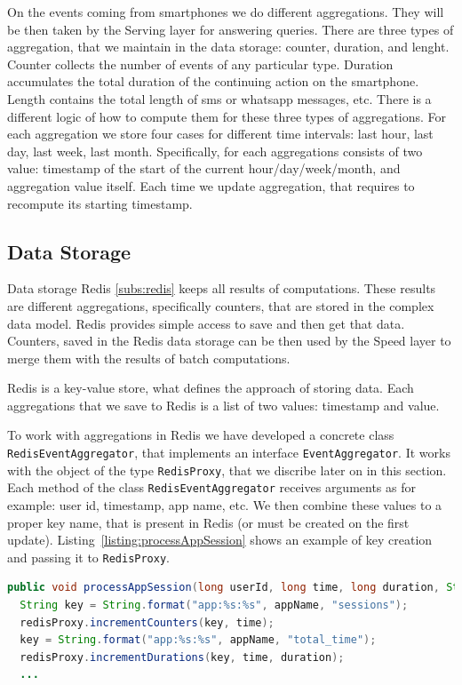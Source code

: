 On the events coming from smartphones we do different aggregations.
They will be then taken by the Serving layer for answering queries.
There are three types of aggregation, that we maintain in the data storage: counter, duration, and lenght.
Counter collects the number of events of any particular type.
Duration accumulates the total duration of the continuing action on the smartphone.
Length contains the total length of sms or whatsapp messages, etc.
There is a different logic of how to compute them for these three types of aggregations. 
For each aggregation we store four cases for different time intervals: last hour, last day, last week, last month.
Specifically, for each aggregations consists of two value: timestamp of the start of the current hour/day/week/month, and aggregation value itself.
Each time we update aggregation, that requires to recompute its starting timestamp.

\subsection{Data Storage}

Data storage Redis \ref{subs:redis} keeps all results of computations.
These results are different aggregations, specifically counters, that are stored in the complex data model.
Redis provides simple access to save and then get that data.
Counters, saved in the Redis data storage can be then used by the Speed layer to merge them with the results of batch computations.

Redis is a key-value store, what defines the approach of storing data.
Each aggregations that we save to Redis is a list of two values: timestamp and value.

To work with aggregations in Redis we have developed a concrete class \lstinline{RedisEventAggregator}, that implements an interface \lstinline{EventAggregator}.
It works with the object of the type \lstinline{RedisProxy}, that we discribe later on in this section.
Each method of the class \lstinline{RedisEventAggregator} receives arguments as for example: user id, timestamp, app name, etc.
We then combine these values to a proper key name, that is present in Redis (or must be created on the first update).
Listing~\ref{listing:processAppSession} shows an example of key creation and passing it to \lstinline{RedisProxy}.

\begin{lstlisting}[float=h, caption=Example of key creation for aggregation update., label=listing:processAppSession, language=Java]
public void processAppSession(long userId, long time, long duration, String appName) {
  String key = String.format("app:%s:%s", appName, "sessions");
  redisProxy.incrementCounters(key, time);
  key = String.format("app:%s:%s", appName, "total_time");
  redisProxy.incrementDurations(key, time, duration);
  ...
\end{lstlisting}

